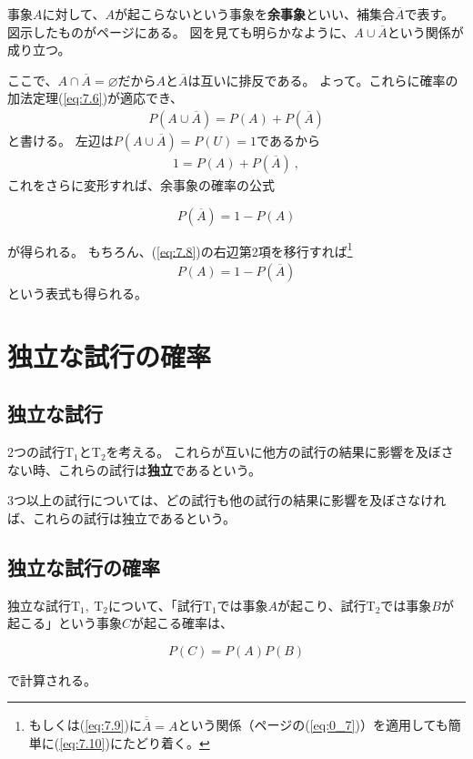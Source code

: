 \documentclass[luatexja,fontsize=12pt]{jlreq}\usepackage{ifthen}\newcounter{enlarge}\setcounter{enlarge}{1}
\newcommand{\eqbox}[1]{\begin{oframed} {#1} \end{oframed} \noindent} %
\begin{document}
事象$A$に対して、$A$が起こらないという事象を\textbf{余事象}といい、補集合$\overline{A}$で表す。
図示したものが\pageref{f:0.1}ページにある。
図を見ても明らかなように、$A \cup \overline{A} $という関係が成り立つ。

ここで、$A \cap \overline{A} = \varnothing $だから$A$と$\overline{A} $は互いに排反である。
よって。これらに確率の加法定理(\ref{eq:7.6})が適応でき、
\begin{align} \label{eq:7.7}
P(A \cup \overline{A} ) = P(A) + P(\overline{A})
\end{align}
と書ける。
左辺は$P(A \cup \overline{A} ) = P(U) = 1$であるから
\begin{align} \label{eq:7.8}
1 = P(A) + P(\overline{A}) ~,
\end{align}
これをさらに変形すれば、余事象の確率の公式
\eqbox{%
\begin{equation} 
P(\overline{A}) =  1 - P(A) \label{eq:7.9}
\end{equation}
}
が得られる。
もちろん、(\ref{eq:7.8})の右辺第2項を移行すれば\footnote{%
もしくは(\ref{eq:7.9})に$\overline{\overline{A}} = A$という関係（\pageref{eq:0_7}ページの(\ref{eq:0_7})）を適用しても簡単に(\ref{eq:7.10})にたどり着く。
}
\begin{align} 
P(A) =  1 - P(\overline{A}) \label{eq:7.10}
\end{align}
という表式も得られる。

\section{独立な試行の確率}

\subsection{独立な試行}

2つの試行$\mathrm{T}_1 $と$\mathrm{T}_2 $を考える。
これらが互いに他方の試行の結果に影響を及ぼさない時、これらの試行は\textbf{独立}であるという。

3つ以上の試行については、どの試行も他の試行の結果に影響を及ぼさなければ、これらの試行は独立であるという。

\subsection{独立な試行の確率}

独立な試行$\mathrm{T}_1 ,~ \mathrm{T}_2 $について、「試行$\mathrm{T}_1 $では事象$A$が起こり、試行$\mathrm{T}_2 $では事象$B$が起こる」という事象$C$が起こる確率は、
\eqbox{%
\begin{equation}
P(C) = P(A) P(B) \label{eq:8.1}
\end{equation}
}
で計算される。
\end{document}
